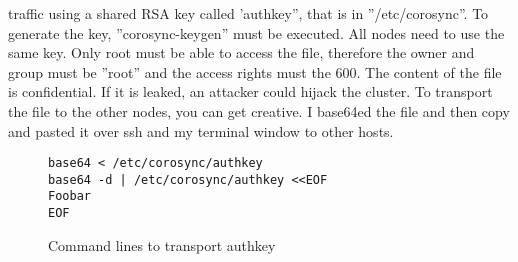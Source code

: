 traffic using a shared RSA key called 'authkey'', that is in ''/etc/corosync''.
To generate the key, ''corosync-keygen'' must be executed. All nodes need to use the same key.
Only root must be able to access the file, therefore the owner and group must be ''root''
and the access rights must the 600. The content of the file is confidential. If it is leaked,
an attacker could hijack the cluster. To transport the file to the other nodes, you
can get creative. I base64ed the file and then copy and pasted it over ssh and my
terminal window to other hosts.
\begin{figure}
\begin{lstlisting}
base64 < /etc/corosync/authkey
base64 -d | /etc/corosync/authkey <<EOF 
Foobar
EOF
\end{lstlisting}
\caption{Command lines to transport authkey}
\end{figure}
